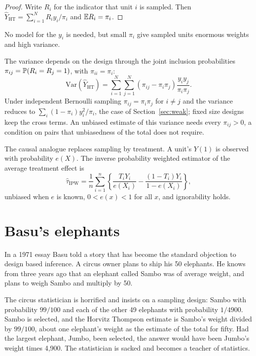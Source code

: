 \begin{proof}
Write $R_i$ for the indicator that unit $i$ is sampled. Then $\hat Y_{\mathrm{HT}} = \sum_{i=1}^N R_i y_i / \pi_i$ and $\mathbb{E} R_i = \pi_i$.
\end{proof}

No model for the $y_i$ is needed, but small $\pi_i$ give sampled units enormous weights and high variance.

The variance depends on the design through the joint inclusion probabilities $\pi_{ij} = \mathbb{P}(R_i = R_j = 1)$, with $\pi_{ii} = \pi_i$:
\[
\mathrm{Var}(\hat Y_{\mathrm{HT}}) = \sum_{i=1}^N\sum_{j=1}^N (\pi_{ij} - \pi_i\pi_j)\frac{y_iy_j}{\pi_i\pi_j}.
\]
Under independent Bernoulli sampling $\pi_{ij} = \pi_i\pi_j$ for $i \neq j$ and the variance reduces to $\sum_i (1 - \pi_i)y_i^2/\pi_i$, the case of Section~\ref{sec:weak}; fixed size designs keep the cross terms. An unbiased estimate of this variance needs every $\pi_{ij} > 0$, a condition on pairs that unbiasedness of the total does not require.

The causal analogue replaces sampling by treatment. A unit's $Y(1)$ is observed with probability $e(X)$. The inverse probability weighted estimator of the average treatment effect is
\begin{equation}
\hat\tau_{\mathrm{IPW}} = \frac{1}{n}\sum_{i=1}^n \left\{\frac{T_i Y_i}{e(X_i)} - \frac{(1-T_i)Y_i}{1 - e(X_i)}\right\},
\label{eq:ipw}
\end{equation}
unbiased when $e$ is known, $0 < e(x) < 1$ for all $x$, and ignorability holds.

\section{Basu's elephants}

In a 1971 essay Basu told a story that has become the standard objection to design based inference. A circus owner plans to ship his 50 elephants. He knows from three years ago that an elephant called Sambo was of average weight, and plans to weigh Sambo and multiply by 50.

The circus statistician is horrified and insists on a sampling design: Sambo with probability $99/100$ and each of the other 49 elephants with probability $1/4900$. Sambo is selected, and the Horvitz Thompson estimate is Sambo's weight divided by $99/100$, about one elephant's weight as the estimate of the total for fifty. Had the largest elephant, Jumbo, been selected, the answer would have been Jumbo's weight times 4,900. The statistician is sacked and becomes a teacher of statistics.

